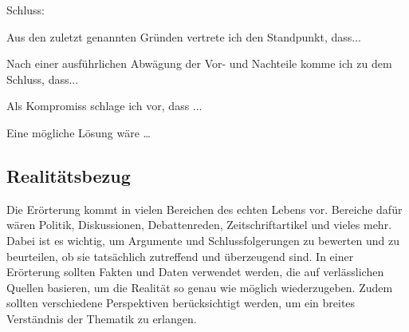 Schluss: 
\begin{compactitem}
    \item Aus den zuletzt genannten Gründen vertrete ich den Standpunkt, dass... 
    \item Nach einer ausführlichen Abwägung der Vor- und Nachteile komme ich zu dem Schluss, dass... 
    \item Als Kompromiss schlage ich vor, dass ...  
    \item Eine mögliche Lösung wäre … 
\end{compactitem}

\subsection{Realitätsbezug}

Die Erörterung kommt in vielen Bereichen des echten Lebens vor.  Bereiche dafür wären Politik, Diskussionen, Debattenreden, Zeitschriftartikel und vieles mehr. Dabei ist es wichtig, um Argumente und Schlussfolgerungen zu bewerten und zu beurteilen, ob sie tatsächlich zutreffend und überzeugend sind. In einer Erörterung sollten Fakten und Daten verwendet werden, die auf verlässlichen Quellen basieren, um die Realität so genau wie möglich wiederzugeben. Zudem sollten verschiedene Perspektiven berücksichtigt werden, um ein breites Verständnis der Thematik zu erlangen. 